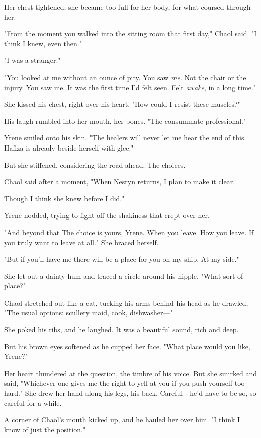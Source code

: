 Her chest tightened; she became too full for her body, for what coursed through her.

"From the moment you walked into the sitting room that first day," Chaol said. "I think I knew, even then."

"I was a stranger."

"You looked at me without an ounce of pity. You saw \emph{me}. Not the chair or the injury. You saw me. It was the first time I'd felt 
seen. Felt \emph{awake}, in a long time."

She kissed his chest, right over his heart. "How could I resist these muscles?"

His laugh rumbled into her mouth, her bones. "The consummate professional."

Yrene smiled onto his skin. "The healers will never let me hear the end of this. Hafiza is already beside herself with glee."

But she stiffened, considering the road ahead. The choices.

Chaol said after a moment, "When Nesryn returns, I plan to make it clear.

Though I think she knew before I did."

Yrene nodded, trying to fight off the shakiness that crept over her.

"And beyond that  The choice is yours, Yrene. When you leave. How you leave. If you truly want to leave at all." She braced herself.

"But if you'll have me  there will be a place for you on my ship. At my side."

She let out a dainty hum and traced a circle around his nipple. "What sort of place?"

Chaol stretched out like a cat, tucking his arms behind his head as he drawled, "The usual options: scullery maid, cook, dishwasher---"

She poked his ribs, and he laughed. It was a beautiful sound, rich and deep.

But his brown eyes softened as he cupped her face. "What place would you like, Yrene?"

Her heart thundered at the question, the timbre of his voice. But she smirked and said, "Whichever one gives me the right to yell at you if you push yourself too hard." She drew her hand along his legs, his back. Careful---he'd have to be so, so careful for a while.

A corner of Chaol's mouth kicked up, and he hauled her over him. "I think I know of just the position."

